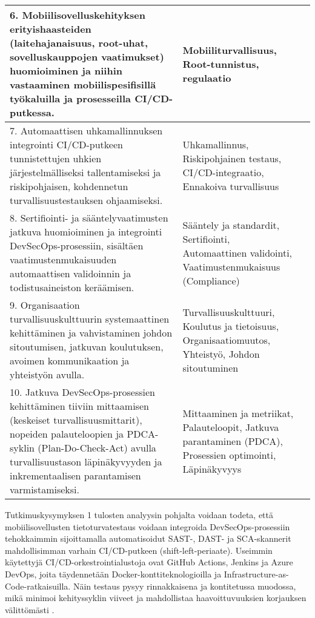 \documentclass[bscthesis,finnish,oneside,biblatex]{uefcsthesis}
\begin{document}
\begin{table}[htbp]
\begin{tabular}{p{6.5cm}p{4cm}p{3cm}}
            \midrule
            6. Mobiilisovelluskehityksen erityishaasteiden (laitehajanaisuus, root-uhat, sovelluskauppojen vaatimukset) huomioiminen ja niihin vastaaminen mobiilispesifisillä työkaluilla ja prosesseilla CI/CD-putkessa. & Mobiiliturvallisuus, Root-tunnistus, regulaatio & \cite{baheux2023_droidsectester, mukti2023_passwordmanager, ozdenizci2024mobilizing, byman2024continuous} \\
            \midrule
            7. Automaattisen uhkamallinnuksen integrointi CI/CD-putkeen tunnistettujen uhkien järjestelmälliseksi tallentamiseksi ja riskipohjaisen, kohdennetun turvallisuustestauksen ohjaamiseksi. & Uhkamallinnus, Riskipohjainen testaus, CI/CD-integraatio, Ennakoiva turvallisuus & \cite{kushwaha2024_cct, nikolov2024_fit} \\
            \midrule
            8. Sertifiointi- ja sääntelyvaatimusten jatkuva huomioiminen ja integrointi DevSecOps-prosessiin, sisältäen vaatimustenmukaisuuden automaattisen validoinnin ja todistusaineiston keräämisen. & Sääntely ja standardit, Sertifiointi, Automaattinen validointi, Vaatimustenmukaisuus (Compliance) & \cite{dupont2021_incremental, byman2024continuous, gottel2023_validating} \\
            \midrule
            9. Organisaation turvallisuuskulttuurin systemaattinen kehittäminen ja vahvistaminen johdon sitoutumisen, jatkuvan koulutuksen, avoimen kommunikaation ja yhteistyön avulla. & Turvallisuuskulttuuri, Koulutus ja tietoisuus, Organisaatiomuutos, Yhteistyö, Johdon sitoutuminen & \cite{offerman2022_practices, chung2024_devsecops, saleem2023_survey} \\
            \midrule
            10. Jatkuva DevSecOps-prosessien kehittäminen tiiviin mittaamisen (keskeiset turvallisuusmittarit), nopeiden palauteloopien ja PDCA-syklin (Plan-Do-Check-Act) avulla turvallisuustason läpinäkyvyyden ja inkrementaalisen parantamisen varmistamiseksi. & Mittaaminen ja metriikat, Palauteloopit, Jatkuva parantaminen (PDCA), Prosessien optimointi, Läpinäkyvyys & \cite{chung2024_devsecops, feio2024_empirical, marandi2023_ias} \\
            \bottomrule
        \end{tabular}
    \end{table}

    Tutkimuskysymyksen 1 tulosten analyysin pohjalta voidaan todeta, että mobiilisovellusten tietoturvatestaus voidaan integroida DevSecOps-prosessiin tehokkaimmin sijoittamalla automatisoidut SAST-, DAST- ja SCA-skannerit mahdollisimman varhain CI/CD-putkeen (shift-left-periaate). Useimmin käytettyjä CI/CD-orkestrointialustoja ovat GitHub Actions, Jenkins ja Azure DevOps, joita täydennetään Docker-konttiteknologioilla ja Infrastructure-as-Code-ratkaisuilla. Näin testaus pysyy rinnakkaisena ja kontitetussa muodossa, mikä minimoi kehityssyklin viiveet ja mahdollistaa haavoittuvuuksien korjauksen välittömästi \cite{marandi2023_ias,feio2024_empirical,kushwaha2024_cct}.
\end{document}
